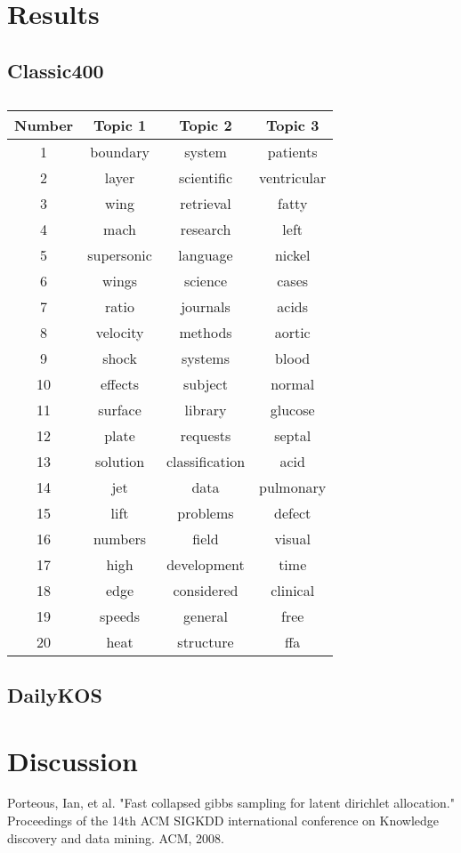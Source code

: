 \documentclass[twoside,12pt]{article}
\begin{document}
\section{Results}
\clearpage
\subsection{Classic400}
\begin{table}
\vspace{-2cm}
\begin{center}
\begin{tabular}{|c|c|c|c|}
\hline
Number & Topic 1 & Topic 2 & Topic 3 \\ \hline
1 & boundary & system & patients  \\ \hline
2 & layer & scientific & ventricular  \\ \hline
3 & wing & retrieval & fatty \\ \hline
4 & mach & research & left  \\ \hline
5 & supersonic & language & nickel\\ \hline
6 & wings & science & cases  \\ \hline
7 & ratio & journals & acids \\ \hline
8 & velocity & methods & aortic  \\ \hline
9 & shock & systems & blood \\ \hline
10 & effects & subject & normal  \\ \hline
11 & surface & library & glucose  \\ \hline
12 & plate & requests & septal  \\ \hline
13 & solution & classification & acid  \\ \hline
14 & jet & data & pulmonary   \\ \hline
15 & lift & problems & defect  \\ \hline
16 & numbers & field & visual \\ \hline
17 & high & development & time  \\ \hline
18 & edge & considered & clinical  \\ \hline
19 & speeds & general & free  \\ \hline
20 & heat & structure & ffa  \\ \hline
\end{tabular}
\caption{}\label{table:2}
\end{center}
\end{table}

\subsection{DailyKOS}

\section{Discussion}


\begin{thebibliography}{9}
Porteous, Ian, et al. "Fast collapsed gibbs sampling for latent dirichlet allocation." Proceedings of the 14th ACM SIGKDD international conference on Knowledge discovery and data mining. ACM, 2008.

\end{thebibliography}
\end{document}

